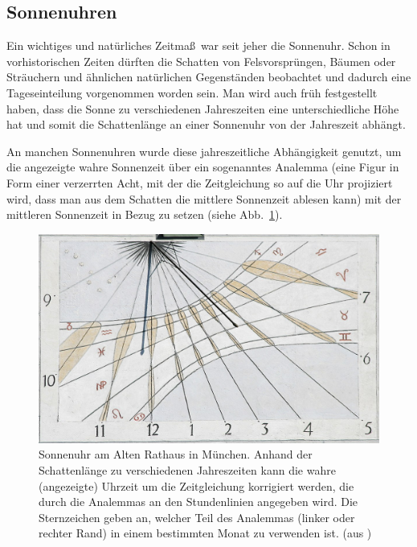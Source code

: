 \subsection{Sonnenuhren}

Ein wichtiges und nat\"urliches Zeitma\ss\ war seit jeher die Sonnenuhr. 
Schon in vorhistorischen Zeiten d\"urften die Schatten von Felsvorspr\"ungen, B\"aumen oder Str\"auchern
und \"ahnlichen nat\"urlichen Gegenst\"anden beobachtet und dadurch eine
Tageseinteilung vorgenommen worden sein. Man wird auch fr\"uh festgestellt haben, dass
die Sonne zu verschiedenen Jahreszeiten eine unterschiedliche H\"ohe hat und somit
die Schattenl\"ange an einer Sonnenuhr von der Jahreszeit abh\"angt. 

An manchen Sonnenuhren wurde diese jahreszeitliche Abh\"angigkeit genutzt, um die angezeigte
wahre Sonnenzeit \"uber ein sogenanntes Analemma (eine Figur in Form einer verzerrten Acht, mit
der die Zeitgleichung so auf die Uhr projiziert wird, dass man aus dem Schatten die mittlere
Sonnenzeit ablesen kann) 
mit der mittleren Sonnenzeit in Bezug zu setzen (siehe Abb.\ \ref{fig_Munich_Analemma}).

\begin{figure}[htb]
\includegraphics[scale=0.3]{./Bilder/Munich_Altes_Rathaus_sundial.jpg}
\caption{\label{fig_Munich_Analemma}%
Sonnenuhr am Alten Rathaus in M\"unchen. Anhand der Schattenl\"ange zu verschiedenen Jahreszeiten
kann die wahre (angezeigte) Uhrzeit um die Zeitgleichung korrigiert werden, die durch die
Analemmas an den Stundenlinien angegeben wird. Die Sternzeichen geben an, welcher
Teil des Analemmas (linker oder rechter Rand) in einem bestimmten Monat zu verwenden ist. (aus \cite{Niermann})} 
\end{figure}

